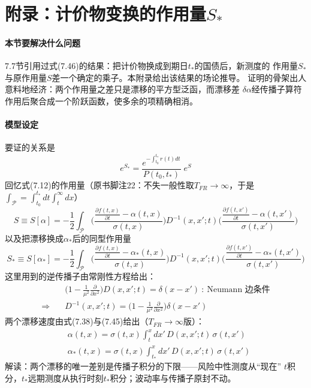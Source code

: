 \section{附录：计价物变换的作用量$S_{*}$}

\paragraph{本节要解决什么问题}
7.7节引用过式(7.46)的结果：把计价物换成到期日$t_{*}$的国债后，新测度的
作用量$S_{*}$与原作用量$S$差一个确定的乘子。本附录给出该结果的场论推导。
证明的骨架出人意料地经济：两个作用量之差只是漂移的平方型泛函，而漂移差
$\delta\alpha$经传播子算符作用后聚合成一个阶跃函数，使多余的项精确相消。

\paragraph{模型设定}
要证的关系是
\begin{equation*}
e^{S_{*}}=\frac{e^{-\int_{t_{0}}^{t_{*}}r(t)dt}}{P(t_{0},t_{*})}\;e^{S}
\tag{7.96}
\end{equation*}
回忆式(7.12)的作用量（原书脚注22：不失一般性取$T_{FR}\to\infty$，于是
$\int_{\mathcal{P}}=\int_{t_{0}}^{t_{*}}dt\int_{t}^{\infty}dx$）
\begin{equation*}
S\equiv S[\alpha]=-\frac{1}{2}\int_{\mathcal{P}}
\biggl(\frac{\frac{\partial f(t,x)}{\partial t}-\alpha(t,x)}{\sigma(t,x)}
\biggr)D^{-1}(x,x';t)
\biggl(\frac{\frac{\partial f(t,x')}{\partial t}-\alpha(t,x')}{\sigma(t,x')}
\biggr)
\tag{7.97}
\end{equation*}
以及把漂移换成$\alpha_{*}$后的同型作用量
\begin{equation*}
S_{*}\equiv S[\alpha_{*}]=-\frac{1}{2}\int_{\mathcal{P}}
\biggl(\frac{\frac{\partial f(t,x)}{\partial t}-\alpha_{*}(t,x)}{\sigma(t,x)}
\biggr)D^{-1}(x,x';t)
\biggl(\frac{\frac{\partial f(t,x')}{\partial t}-\alpha_{*}(t,x')}{\sigma(t,x')}
\biggr)
\tag{7.98}
\end{equation*}
这里用到的逆传播子由常刚性方程给出：
\begin{align*}
&\biggl(1-\frac{1}{\mu^{2}}\frac{\partial}{\partial x^{2}}\biggr)
D(x,x';t)=\delta(x-x')\ :\ \text{Neumann 边条件}\\
\Rightarrow\quad&D^{-1}(x,x';t)=\biggl(1-\frac{1}{\mu^{2}}
\frac{\partial}{\partial x^{2}}\biggr)\delta(x-x')
\tag{7.99}
\end{align*}
两个漂移速度由式(7.38)与(7.45)给出（$T_{FR}\to\infty$版）：
\begin{align*}
&\alpha(t,x)=\sigma(t,x)\int_{t}^{x}dx'\,D(x,x';t)\,\sigma(t,x')\\
&\alpha_{*}(t,x)=\sigma(t,x)\int_{t_{*}}^{x}dx'\,D(x,x';t)\,\sigma(t,x')
\tag{7.100}
\end{align*}
解读：两个漂移的唯一差别是传播子积分的下限——风险中性测度从“现在”
$t$积分，$t_{*}$远期测度从执行时刻$t_{*}$积分；波动率与传播子原封不动。

